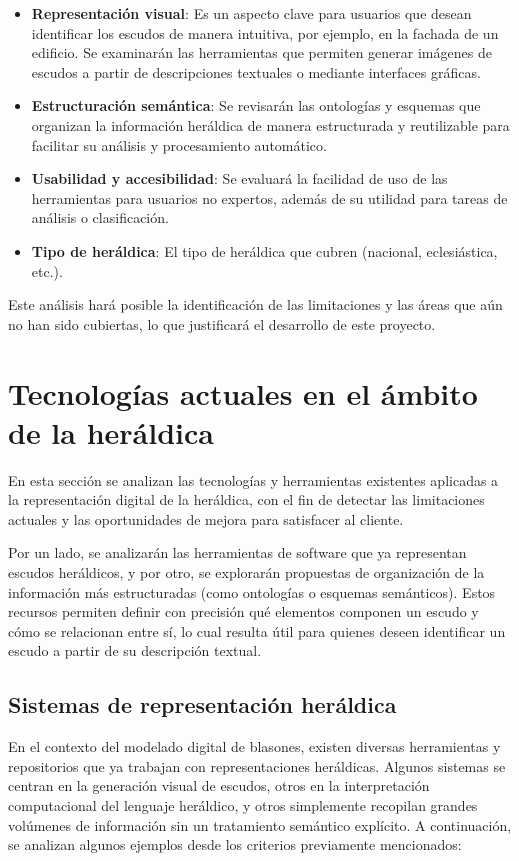 \begin{itemize}
    \item \textbf{Representación visual}: Es un aspecto clave para usuarios que desean identificar
    los escudos de manera intuitiva, por ejemplo, en la fachada de un edificio. Se examinarán las 
    herramientas que permiten generar imágenes de escudos a partir de descripciones textuales o 
    mediante interfaces gráficas.
    \item \textbf{Estructuración semántica}: Se revisarán las ontologías y esquemas que
    organizan la información heráldica de manera estructurada y reutilizable para facilitar
    su análisis y procesamiento automático.
    \item \textbf{Usabilidad y accesibilidad}: Se evaluará la facilidad de uso de las herramientas
    para usuarios no expertos, además de su utilidad para tareas de análisis o clasificación.
    \item \textbf{Tipo de heráldica}: El tipo de heráldica que cubren (nacional, eclesiástica, etc.).
\end{itemize}

Este análisis hará posible la identificación de las limitaciones y las áreas que aún no han sido
cubiertas, lo que justificará el desarrollo de este proyecto.

\section{Tecnologías actuales en el ámbito de la heráldica}
En esta sección se analizan las tecnologías y herramientas existentes aplicadas a la representación
digital de la heráldica, con el fin de detectar las limitaciones actuales y las oportunidades
de mejora para satisfacer al cliente.

Por un lado, se analizarán las herramientas de software que ya representan escudos heráldicos,
y por otro, se explorarán propuestas de organización de la información más estructuradas
(como ontologías o esquemas semánticos). Estos recursos permiten definir con precisión
qué elementos componen un escudo y cómo se relacionan entre sí, lo cual resulta útil para
quienes deseen identificar un escudo a partir de su descripción textual.

\subsection{Sistemas de representación heráldica}
En el contexto del modelado digital de blasones, existen diversas herramientas y repositorios
que ya trabajan con representaciones heráldicas. Algunos sistemas se centran en la generación 
visual de escudos, otros en la interpretación computacional del lenguaje heráldico, y otros 
simplemente recopilan grandes volúmenes de información sin un tratamiento semántico explícito. 
A continuación, se analizan algunos ejemplos desde los criterios previamente mencionados:

